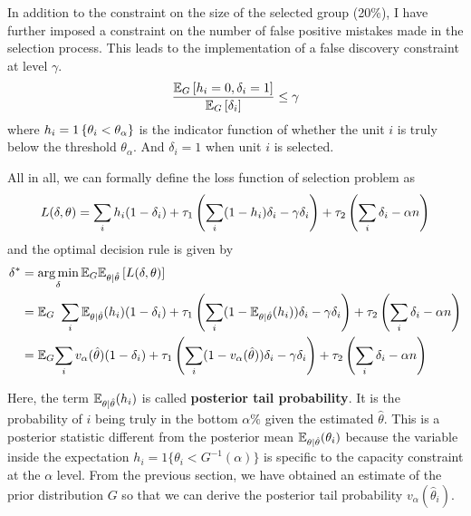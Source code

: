 \documentclass[12pt]{article}
\begin{document}
In addition to the constraint on the size of the selected group (20\%), I have
further imposed a constraint on the number of false positive mistakes made in
the selection process. This leads to the implementation of a false discovery
constraint at level \( \gamma \).
\begin{equation*}
    \frac{\mathbb{E}_G\left[h_i=0,\delta_i=1\right]}{\mathbb{E}_G\left[\delta_i\right]} \le \gamma
\end{equation*} where $h_i=1\left\{\theta_i<\theta_\alpha\right\}$ is the indicator function of whether the unit $i$ is truly below the threshold $\theta_\alpha$. And $\delta_i=1$ when unit $i$ is selected.

All in all, we can formally define the loss function of selection problem as
\begin{equation*}
    L(\delta,\theta)=\sum_i h_i(1-\delta_i) +\tau_1\left(\sum_i (1-h_i)\delta_i -\gamma \delta_i\right) + \tau_2 \left(\sum_i \delta_i -\alpha n\right)
\end{equation*}
and the optimal decision rule is given by
\begin{equation} \label{eq:decisionrule}
    \begin{split}
        \delta^* & =\operatorname*{arg\,min}_\delta \mathbb{E}_G\mathbb{E}_{\theta|\hat{\theta}}\left[L(\delta,\theta)\right]                                                                                                              \\
        & = \mathbb{E}_G \ \sum_i \mathbb{E}_{\theta|\hat{\theta}}(h_i)(1-\delta_i) +\tau_1\left(\sum_i (1-\mathbb{E}_{\theta|\hat{\theta}}(h_i))\delta_i -\gamma \delta_i\right) + \tau_2 \left(\sum_i \delta_i -\alpha n\right) \\
        & =\mathbb{E}_G{\sum_i v_\alpha(\hat{\theta})(1-\delta_i) +\tau_1\left(\sum_i (1-v_\alpha(\hat{\theta}))\delta_i -\gamma \delta_i\right) + \tau_2 \left(\sum_i \delta_i -\alpha n\right)}
    \end{split}
\end{equation}

Here, the term \(\mathbb{E}_{\theta|\hat{\theta}}(h_i)\) is called \textbf{posterior
    tail probability}. It is the probability of \(i\) being truly in the bottom
\(\alpha\%\) given the estimated \(\hat{\theta}\). This is a posterior
statistic different from the posterior mean
\(\mathbb{E}_{\theta|\hat{\theta}}(\theta_i)\) because the variable inside the
expectation \(h_i = 1\{\theta_i < G^{-1}(\alpha)\}\) is specific to the
capacity constraint at the \(\alpha\) level. From the previous section, we have
obtained an estimate of the prior distribution \(G\) so that we can derive the
posterior tail probability \(v_\alpha(\hat{\theta}_i)\).
\end{document}
